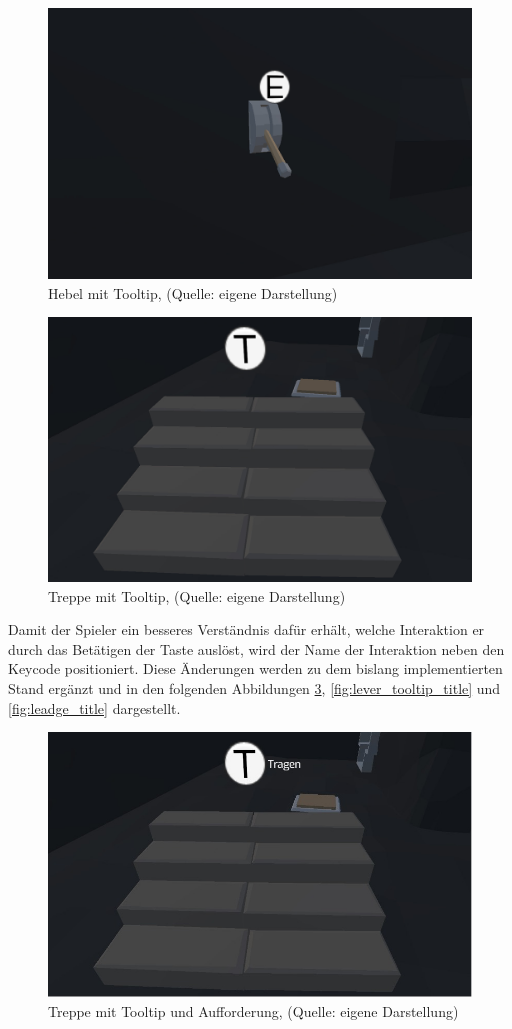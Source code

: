 \begin{figure}[ht]
\centering
\includegraphics[width=0.8\linewidth]{content/pictures/lever_tooltip.jpg}
\caption{Hebel mit Tooltip, (Quelle: eigene Darstellung)}
\label{fig:lever_tooltip}
\end{figure}

\begin{figure}[ht]
\centering
\includegraphics[width=0.8\linewidth]{content/pictures/carry_tooltip.jpg}
\caption{Treppe mit Tooltip, (Quelle: eigene Darstellung)}
\label{fig:stair_tooltip}
\end{figure}

Damit der Spieler ein besseres Verständnis dafür erhält, welche Interaktion er durch das Betätigen der Taste auslöst, wird der Name der Interaktion neben den Keycode positioniert. Diese Änderungen werden zu dem bislang implementierten Stand ergänzt und in den folgenden Abbildungen \ref{fig:stair_tooltip_title}, \ref{fig:lever_tooltip_title} und \ref{fig:leadge_title} dargestellt.

\begin{figure}[ht]
\centering
\includegraphics[width=0.8\linewidth]{content/pictures/stair_tooltip_title.jpg}
\caption{Treppe mit Tooltip und Aufforderung, (Quelle: eigene Darstellung)}
\label{fig:stair_tooltip_title}
\end{figure}

